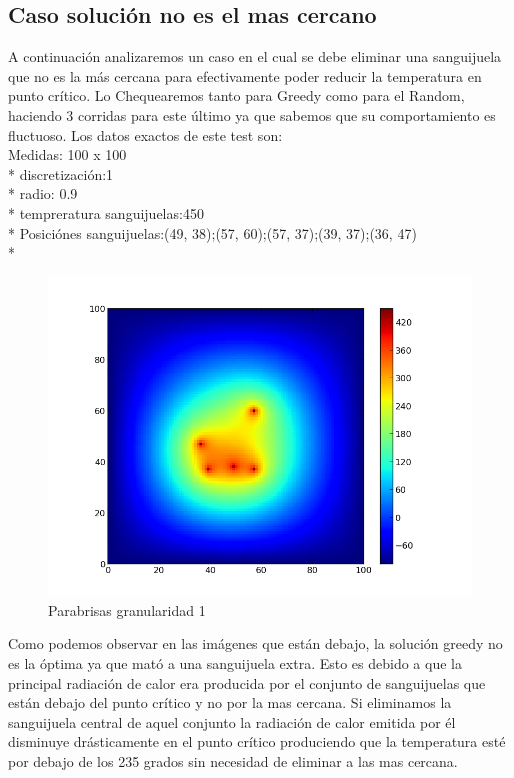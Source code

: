 \subsection{Caso solución no es el mas cercano}

A continuación analizaremos un caso en el cual se debe eliminar una sanguijuela que no es la más cercana para efectivamente poder reducir la temperatura en punto crítico. Lo Chequearemos tanto para Greedy como para el Random, haciendo 3 corridas para este último ya que sabemos que su comportamiento es fluctuoso.
Los datos exactos de este test son:\\
Medidas: 100 x 100 \\* 
discretización:1 \\* 
radio: 0.9 \\* 
tempreratura sanguijuelas:450 \\* 
Posiciónes sanguijuelas:(49, 38);(57, 60);(57, 37);(39, 37);(36, 47) \\* 
\begin{figure}[htb]
\begin{center}
\includegraphics[scale=0.40]{imagenes/test6.png} 
\caption{Parabrisas granularidad 1} 
\end{center}
\end{figure}

Como podemos observar en las imágenes que están debajo, la solución greedy no es la óptima ya que mató a una sanguijuela extra. Esto es debido a que la principal radiación de calor era producida por el conjunto de 
sanguijuelas que están debajo del punto crítico y no por la mas cercana. Si eliminamos la sanguijuela central de aquel conjunto la radiación de calor emitida por él disminuye drásticamente en el punto crítico produciendo 
que la temperatura esté por debajo de los 235 grados sin necesidad de eliminar a las mas cercana. 

